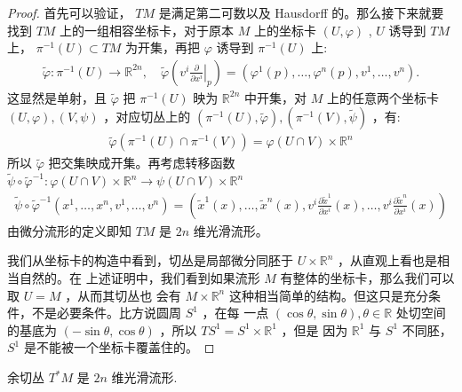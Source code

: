 \begin{proof}
首先可以验证， $T M$ 是满足第二可数以及 Hausdorff 的。那么接下来就要找到 $T M$ 上的一组相容坐标卡，对于原本 $M$ 上的坐标卡 $(U, \varphi)$ , $U$ 诱导到 $T M$ 上， $\pi^{-1}(U) \subset T M$ 为开集，再把 $\varphi$ 诱导到 $\pi^{-1}(U)$ 上:
\begin{align*}
\tilde{\varphi}: \pi^{-1}(U) \rightarrow \mathbb{R}^{2 n}, \quad \tilde{\varphi}\left(\left.v^i \frac{\partial}{\partial x^i}\right|_p\right)=\left(\varphi^1(p), \ldots, \varphi^n(p), v^1, \ldots, v^n\right) .
\end{align*}
这显然是单射，且 $\tilde{\varphi}$ 把 $\pi^{-1}(U)$ 映为 $\mathbb{R}^{2 n}$ 中开集，对 $M$ 上的任意两个坐标卡 $(U, \varphi),(V, \psi)$ ，对应切丛上的 $\left(\pi^{-1}(U), \tilde{\varphi}\right),\left(\pi^{-1}(V), \tilde{\psi}\right)$ ，有:
\begin{align*}
\tilde{\varphi}\left(\pi^{-1}(U) \cap \pi^{-1}(V)\right)=\varphi(U \cap V) \times \mathbb{R}^n
\end{align*}
所以 $\tilde{\varphi}$ 把交集映成开集。再考虑转移函数 $\tilde{\psi} \circ \tilde{\varphi}^{-1}: \varphi(U \cap V) \times \mathbb{R}^n \rightarrow \psi(U \cap V) \times \mathbb{R}^n$
\begin{align*}
\tilde{\psi} \circ \tilde{\varphi}^{-1}\left(x^1, \ldots, x^n, v^1, \ldots, v^n\right)=\left(\tilde{x}^1(x), \ldots, \tilde{x}^n(x), v^i \frac{\partial \tilde{x}^1}{\partial x^i}(x), \ldots, v^i \frac{\partial \tilde{x}^n}{\partial x^i}(x)\right)
\end{align*}
由微分流形的定义即知 $T M$ 是 $2 n$ 维光滑流形。

我们从坐标卡的构造中看到，切丛是局部微分同胚于 $U \times \mathbb{R}^n$ ，从直观上看也是相当自然的。在 上述证明中，我们看到如果流形 $M$ 有整体的坐标卡，那么我们可以取 $U=M$ ，从而其切丛也 会有 $M \times \mathbb{R}^n$ 这种相当简单的结构。但这只是充分条件，不是必要条件。比方说圆周 $S^1$ ，在每 一点 $(\cos \theta, \sin \theta), \theta \in \mathbb{R}$ 处切空间的基底为 $(-\sin \theta, \cos \theta)$ ，所以 $T S^1=S^1 \times \mathbb{R}^1$ ，但是 因为 $\mathbb{R}^1$ 与 $S^1$ 不同胚， $S^1$ 是不能被一个坐标卡覆盖住的。
\end{proof}
\begin{thm}
    余切丛 $T^* M$ 是 $2n$ 维光滑流形.
\end{thm}

